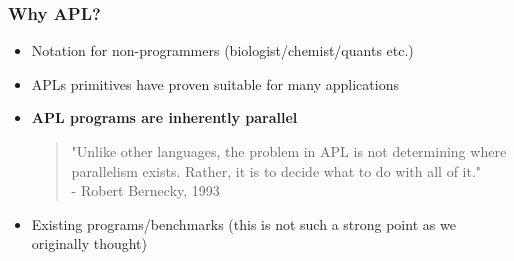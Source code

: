 \documentclass{beamer}
\begin{document}
\begin{frame}
\frametitle{Why APL?}
\begin{itemize}
\item 
Notation for non-programmers (biologist/chemist/quants etc.)
\item 
APLs primitives have proven suitable for many applications
\item 
\textbf{APL programs are inherently parallel}
  \begin{quotation}
    \noindent
    "Unlike other languages, the problem in APL is not determining
    where parallelism exists. Rather, it is to decide what to do with
    all of it." \\
      - Robert Bernecky, 1993
  \end{quotation}
\item Existing programs/benchmarks (this is not such a strong point as
  we originally thought)
\end{itemize}

\end{frame}
\end{document}
